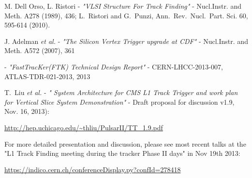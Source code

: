 \documentclass{cmspaper}
\begin{document}
%
%
%









%




\newpage
\thispagestyle{empty}

\begin{thebibliography}{99}


 M. Dell Orso, L. Ristori - {\it "VLSI Structure For Track Finding"} - Nucl.Instr. and Meth. A278 (1989), 436; L.~Ristori and G.~Punzi, Ann.~Rev.~Nucl.~Part. Sci. 60, 595-614 (2010).

 J. Adelman {\it et al.} - {\it "The Silicon Vertex Trigger upgrade at CDF"} - Nucl.Instr. and Meth. A572 (2007), 361

  - {\it "FastTracKer(FTK) Technical Design Report"} - CERN-LHCC-2013-007, ATLAS-TDR-021-2013, 2013


 T.~Liu {\it et al.} - {\it "
System Architecture for CMS L1 Track Trigger and work plan for Vertical Slice System
Demonstration"} - Draft proposal for discussion v1.9, Nov. 16, 2013):

\url{http://hep.uchicago.edu/~thliu/PulsarII/TT_1.9.pdf}

For more detailed presentation and discussion, please see most recent talks at the "L1 Track Finding meeting during the tracker Phase II days" in Nov 19th 2013:

\url{https://indico.cern.ch/conferenceDisplay.py?confId=278418}







\end{thebibliography}
\end{document}
